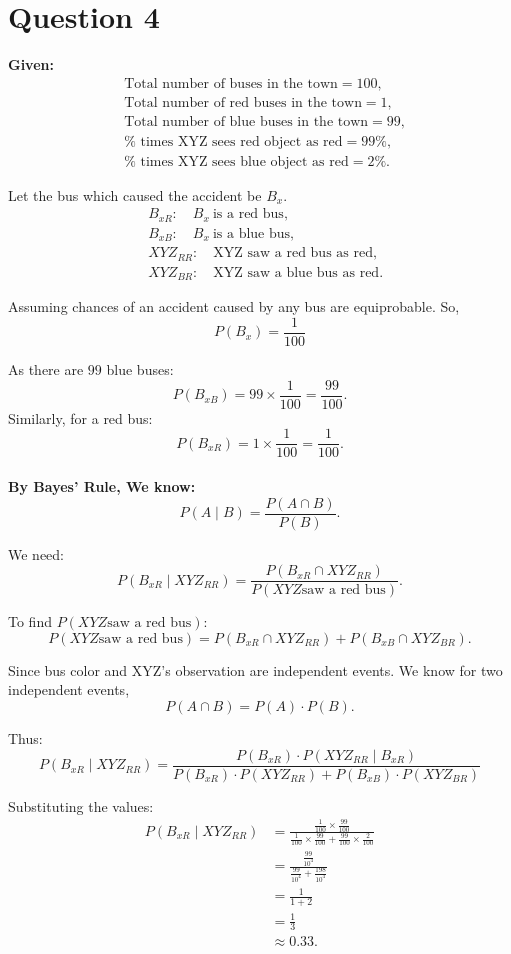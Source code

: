 \documentclass[12pt]{article}
\begin{document}
\section{Question 4}
\noindent
\textbf{Given:}
\begin{align*}
&\text{Total number of buses in the town} = 100, \\
&\text{Total number of red buses in the town} = 1, \\
&\text{Total number of blue buses in the town} = 99, \\
&\% \text{ times XYZ sees red object as red} = 99\%, \\
&\% \text{ times XYZ sees blue object as red} = 2\%.
\end{align*}

\noindent
Let the bus which caused the accident be $B_x$.  
\begin{align*}
& B_{xR}: \quad B_x \ \text{is a red bus}, \\
& B_{xB}: \quad B_x \ \text{is a blue bus}, \\
& XYZ_{RR}: \quad \text{XYZ saw a red bus as red}, \\
& XYZ_{BR}: \quad \text{XYZ saw a blue bus as red}.
\end{align*}

\noindent
Assuming chances of an accident caused by any bus are equiprobable. So,
\[
P(B_x) = \frac{1}{100}
\]

\noindent
As there are $99$ blue buses:
\[
P(B_{xB}) = 99 \times \frac{1}{100} = \frac{99}{100}.
\]
Similarly, for a red bus:
\[
P(B_{xR}) = 1 \times \frac{1}{100} = \frac{1}{100}.
\]
\\
\noindent
\textbf{By Bayes' Rule, We know:}
\[
P(A \mid B) = \frac{P(A \cap B)}{P(B)}.
\]

\noindent
We need:
\[
P(B_{xR} \mid XYZ_{RR}) 
= \frac{P(B_{xR} \cap XYZ_{RR})}{P(XYZ \text{saw a red bus})}.
\]

\noindent
To find $P(XYZ \text{saw a red bus})$:
\[
P(XYZ \text{saw a red bus}) = P(B_{xR} \cap XYZ_{RR}) + P(B_{xB} \cap XYZ_{BR}).
\]

\noindent
Since bus color and XYZ's observation are independent events. We know for two independent events,
\[
P(A \cap B) = P(A) \cdot P(B).
\]

\noindent
Thus:
\[
P(B_{xR} \mid XYZ_{RR}) = 
\frac{P(B_{xR}) \cdot P(XYZ_{RR} \mid B_{xR})}
{P(B_{xR}) \cdot P(XYZ_{RR}) + P(B_{xB}) \cdot P(XYZ_{BR})}
\]

\noindent
Substituting the values:
\begin{align*}
P(B_{xR} \mid XYZ_{RR}) 
&= \frac{\frac{1}{100} \times \frac{99}{100}}
{\frac{1}{100} \times \frac{99}{100} + \frac{99}{100} \times \frac{2}{100}} \\[4pt]
&= \frac{\frac{99}{10^4}}
{\frac{99}{10^4} + \frac{198}{10^4}} \\[4pt]
&= \frac{1}{1+2} \\[4pt]
&= \frac{1}{3} \\[4pt]
&\approx 0.33.
\end{align*}
\end{document}
